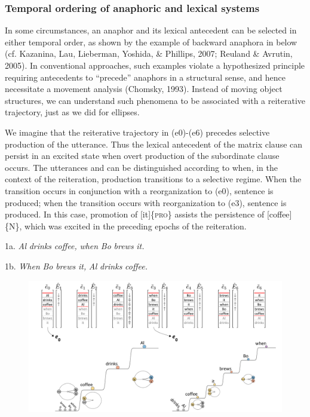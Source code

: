 \subsubsection{Temporal ordering of anaphoric and lexical systems}

In some circumstances, an anaphor and its lexical antecedent can be selected in either temporal order, as shown by the example of backward anaphora in  below (cf. Kazanina, Lau, Lieberman, Yoshida, \& Phillips, 2007; Reuland \& Avrutin, 2005). In conventional approaches, such examples violate a hypothesized principle requiring antecedents to “precede” anaphors in a structural sense, and hence necessitate a movement analysis (Chomsky, 1993). Instead of moving object structures, we can understand such phenomena to be associated with a reiterative trajectory, just as we did for ellipses.

  We imagine that the reiterative trajectory in (e0)-(e6) precedes selective production of the utterance. Thus the lexical antecedent of the matrix clause can persist in an excited state when overt production of the subordinate clause occurs. The utterances  and  can be distinguished according to when, in the context of the reiteration, production transitions to a selective regime. When the transition occurs in conjunction with a reorganization to (e0), sentence  is produced; when the transition occurs with reorganization to (e3), sentence  is produced. In this case, promotion of [it]\{\textsc{pro}\} assists the persistence of [coffee]\{N\}, which was excited in the preceding epochs of the reiteration.

1a. \textit{Al} \textit{drinks} \textit{coffee,} \textit{when} \textit{Bo} \textit{brews} \textit{it.}

1b. \textit{When} \textit{Bo} \textit{brews} \textit{it,} \textit{Al} \textit{drinks} \textit{coffee.}    

  
\begin{figure}
\includegraphics[width=\textwidth]{figures/Tilsen-img154.png}
\caption{\missingcaption}
\label{fig:}
\end{figure}
 

